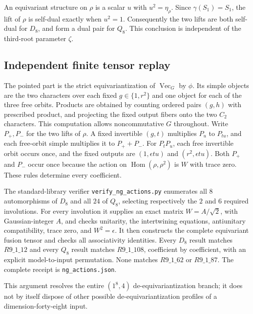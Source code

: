 An equivariant structure on $\rho$ is a scalar $u$ with
$u^2=\eta_\rho$. Since $\gamma(S_1)=S_1$, the lift of $\rho$ is
self-dual exactly when $u^2=1$. Consequently the two lifts are both
self-dual for $D_8$, and form a dual pair for $Q_8$.
This conclusion is independent of the third-root parameter $\zeta$.

\subsection{Independent finite tensor replay}
The pointed part is the strict equivariantization of $\operatorname{Vec}_G$
by $\phi$. Its simple objects are the two characters over each fixed
$g\in\{1,r^2\}$ and one object for each of the three free orbits.
Products are obtained by counting ordered pairs $(g,h)$ with prescribed
product, and projecting the fixed output fibers onto the two $C_2$
characters. This computation allows noncommutative $G$ throughout.
Write $P_+,P_-$ for the two lifts of $\rho$. A fixed invertible
$(g,t)$ multiplies $P_u$ to $P_{tu}$, and each free-orbit simple multiplies
it to $P_++P_-$. For $P_tP_u$, each free invertible orbit occurs once,
and the fixed outputs are
$(1,\epsilon tu)$ and $(r^2,\epsilon tu)$.
Both $P_+$ and $P_-$ occur once because the action on
$\operatorname{Hom}(\rho,\rho^2)$ is $W$ with trace zero.
These rules determine every coefficient.

The standard-library verifier \nolinkurl{verify_ng_actions.py} enumerates
all $8$ automorphisms of $D_8$ and all $24$ of $Q_8$, selecting respectively
the $2$ and $6$ required involutions. For every involution it supplies
an exact matrix $W=A/\sqrt2$, with Gaussian-integer $A$, and checks
unitarity, the intertwining equations, antiunitary compatibility, trace
zero, and $W^2=\epsilon$. It then constructs the complete equivariant
fusion tensor and checks all associativity identities. Every $D_8$
result matches $R9\_1\_12$ and every $Q_8$ result matches
$R9\_1\_108$, coefficient by coefficient, with an explicit
model-to-input permutation. None matches $R9\_1\_62$ or $R9\_1\_87$.
The complete receipt is \nolinkurl{ng_actions.json}.

This argument resolves the entire $(1^8,4)$ de-equivariantization branch;
it does not by itself dispose of other possible de-equivariantization
profiles of a dimension-forty-eight input.
